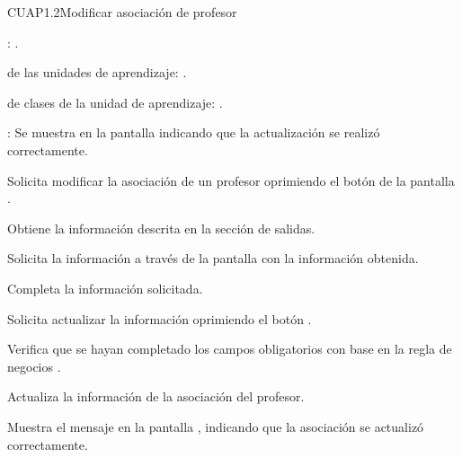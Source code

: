 \begin{UseCase}{CUAP1.2}{Modificar asociación de profesor}
{\begin{UClist}
			\UCli {}: \ioObtener.
			
			\UCli {} de las unidades de aprendizaje: \ioObtener.
			
			\UCli {} de clases de la unidad de aprendizaje: \ioObtener.
			
			\UCli {}: Se muestra en la pantalla  indicando que la actualización se realizó correctamente.
		\end{UClist}
	}
\end{UseCase}

\begin{UCtrayectoria}
	\UCpaso [\UCactor] Solicita modificar la asociación de un profesor oprimiendo el botón  de la pantalla . 
	
	\UCpaso [\UCsist] Obtiene la información descrita en la sección de salidas.
	
	\UCpaso [\UCsist] Solicita la información a través de la pantalla  con la información obtenida.
	
	\UCpaso [\UCactor] Completa la información solicitada. \label{CUAP1.2:CompletaInfo}
	
	\UCpaso [\UCactor] Solicita actualizar la información oprimiendo el botón . 
	
	\UCpaso [\UCsist] Verifica que se hayan completado los campos obligatorios con base en la regla de negocios . 
	
	\UCpaso [\UCsist] Actualiza la información de la asociación del profesor.
	
	\UCpaso [\UCsist] Muestra el mensaje  en la pantalla , indicando que la asociación se actualizó correctamente.	
	
\end{UCtrayectoria}



